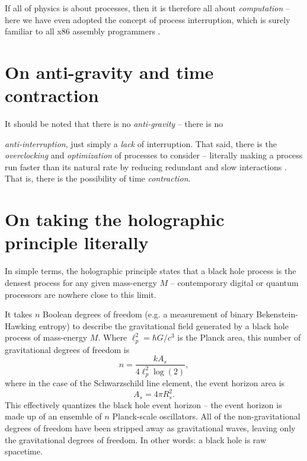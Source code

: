 \documentclass[12pt]{article}
\begin{document}
If all of physics is about processes, then it is therefore all about {\textit{computation}} \cite{zuse, wolfram} -- here we have even adopted the concept of process interruption, which is surely familiar to all x86 assembly programmers \cite{abrash}.







\section{On anti-gravity and time contraction}

It should be noted that there is no {\textit{anti-gravity}} -- there is no {\textit{anti-interruption}, just simply a {\textit{lack}} of interruption.
That said, there is the {\textit{overclocking}} and {\textit{optimization}} of processes to consider -- literally making a process run faster than its natural rate by reducing redundant and slow interactions \cite{wainner, mcconnell, pikus}.
That is, there is the possibility of time {\textit{contraction}}.






\section{On taking the holographic principle literally}

In simple terms, the holographic principle states that a black hole process is the densest process for any given mass-energy $M$ -- contemporary digital or quantum processors are nowhere close to this limit.

It takes $n$ Boolean degrees of freedom (e.g. a measurement of binary Bekenstein-Hawking entropy) to describe the gravitational field \cite{hooft, susskind, bousso} generated by a black hole process of mass-energy $M$.
Where $\ell_p^2 = \hbar G / c^3$ is the Planck area, this number of gravitational degrees of freedom is
\begin{equation}
n = \frac{k A_s}{4 \ell_p^2 \log(2)},
\end{equation}
where in the case of the Schwarzschild line element, the event horizon area is
\begin{equation}
A_s = 4 \pi R_s^2.
\end{equation}
This effectively quantizes the black hole event horizon -- the event horizon is made up of an ensemble of $n$ Planck-scale oscillators.
All of the non-gravitational degrees of freedom have been stripped away as gravitational waves, leaving only the gravitational degrees of freedom.
In other words: a black hole is raw spacetime.

}
\end{document}
